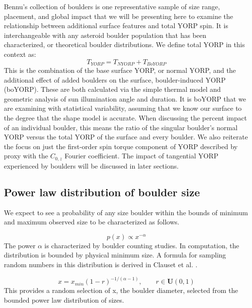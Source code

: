 Bennu's collection of boulders is one representative sample of size range, placement, and global impact that we will be presenting here to examine the relationship between additional surface features and total YORP spin. It is interchangeable with any asteroid boulder population that has been characterized, or theoretical boulder distributions. We define total YORP in this context as:
\begin{equation}
    T_{YORP} = T_{NYORP} + T_{BoYORP}
    \label{eq:ugh}
\end{equation}
This is the combination of the base surface YORP, or normal YORP, and the additional effect of added boulders on the surface, boulder-induced YORP (boYORP). These are both calculated via the simple thermal model and geometric analysis of sun illumination angle and duration. It is boYORP that we are examining with statistical variability, assuming that we know our surface to the degree that the shape model is accurate. When discussing the percent impact of an individual boulder, this means the ratio of the singular boulder's normal YORP versus the total YORP of the surface and every boulder. We also reiterate the focus on just the first-order spin torque component of YORP described by proxy with the $C_{0,z}$ Fourier coefficient. The impact of tangential YORP experienced by boulders will be discussed in later sections. 


\subsection{Power law distribution of boulder size}
We expect to see a probability of any size boulder within the bounds of minimum and maximum observed size to be characterized as follows. 

\begin{equation}
    p(x) \propto x^{-\alpha}
\end{equation}
The power $\alpha$ is characterized by boulder counting studies. In computation, the distribution is bounded by physical minimum size. A formula for sampling random numbers in this distribution is derived in Clauset et al. \cite{Clauset2009}.

\begin{equation}
    x = x_{min}(1-r)^{-1/(\alpha-1)},\qquad r \in \mathbf{U}(0,1)
\end{equation}
This provides a random selection of x, the boulder diameter, selected from the bounded power law distribution of sizes. 


